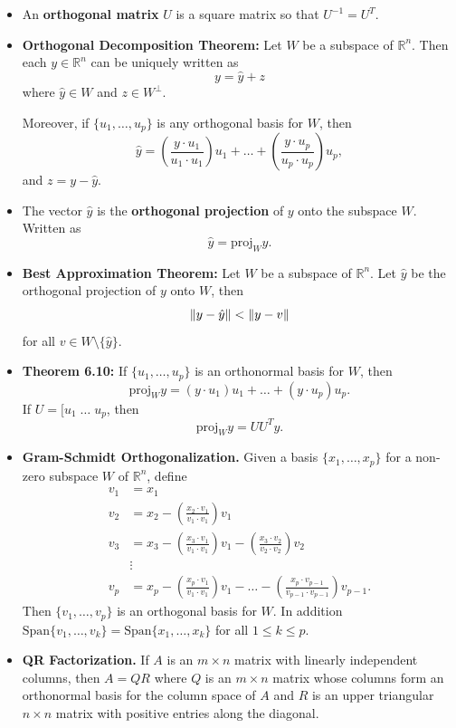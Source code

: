 \begin{itemize}
\item An {\bf orthogonal matrix} $U$ is a square matrix so that $U^{-1}=U^{T}$.
\item  {\bf Orthogonal Decomposition Theorem:} Let $W$ be a subspace of $\mathbb{R}^n$. Then each $y \in \mathbb{R}^n$ can be uniquely written as $$y=\hat{y} + z$$ where $\hat{y} \in W$ and $z \in W^{\perp}$. 

Moreover, if $\{u_1, \dots, u_p\}$ is any orthogonal basis for $W$, then $$\hat{y}= \left(\frac{y \cdot u_1}{u_1 \cdot u_1} \right)u_1+\dots+  \left(\frac{y \cdot u_p}{u_p \cdot u_p} \right)u_p,$$ and $z=y-\hat{y}$.
\item The vector $\hat{y}$ is the {\bf orthogonal projection} of $y$ onto the subspace $W$. Written as $$\hat{y}=\text{proj}_{W}{y}.$$
\item {\bf Best Approximation Theorem:} Let $W$ be a subspace of $\mathbb{R}^n$. Let $\hat{y}$ be the orthogonal projection of $y$ onto $W$, then $$\left\lVert y-\hat{y}\right\rVert < \left\lVert y-v\right\rVert$$ for all $v\in W \setminus \{\hat{y}\}$.
\item {\bf Theorem 6.10:} If $\{ u_1, \dots, u_p\}$ is an orthonormal basis for $W$, then $$\text{proj}_{W}{y} =(y\cdot u_1) u_1 +\dots +(y \cdot u_p) u_p.$$ If $U=[u_1 \; \dots \; u_p$, then $$\text{proj}_{W}{y} =U U^{T} y.$$
\item {\bf Gram-Schmidt Orthogonalization.} Given a basis $\{x_1, \dots, x_p\}$ for a non-zero subspace $W$ of $\mathbb{R}^n$, define 
\begin{align*}
v_1 & = x_1\\
v_2 & = x_2 - \left( \frac{x_2 \cdot v_1}{v_1 \cdot v_1} \right) v_1\\
v_3 & = x_3 -\left( \frac{x_3 \cdot v_1}{v_1 \cdot v_1} \right) v_1-\left( \frac{x_3 \cdot v_2}{v_2 \cdot v_2} \right) v_2\\
&\vdots\\
v_p & = x_p -\left( \frac{x_p \cdot v_1}{v_1 \cdot v_1} \right) v_1-\dots -\left( \frac{x_p \cdot v_{p-1}}{v_{p-1} \cdot v_{p-1}} \right) v_{p-1}.
\end{align*}
Then $\{v_1, \dots, v_p\}$ is an orthogonal basis for $W$. In addition $\text{Span}\{v_1,\dots, v_k\}=\text{Span}\{ x_1, \dots, x_k\}$ for all $1 \leq k \leq p$.
\item {\bf QR Factorization.} If $A$ is an $m\times n$ matrix with linearly independent columns, then $A=QR$ where $Q$ is an $m\times n$ matrix whose columns form an orthonormal basis for the column space of $A$ and $R$ is an upper triangular $n \times n$ matrix with positive entries along the diagonal. 
\end{itemize}

